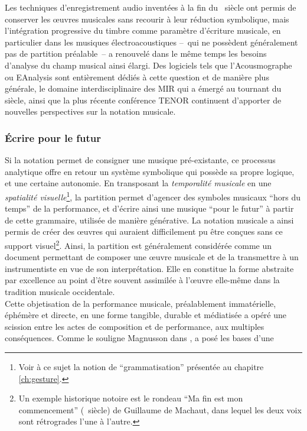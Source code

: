 \noindent Les techniques d'enregistrement audio inventées à la fin du ~siècle ont permis de conserver les œuvres musicales sans recourir à leur réduction symbolique, mais l'intégration progressive du timbre comme paramètre d'écriture musicale, en particulier dans les musiques électroacoustiques --~qui ne possèdent généralement pas de partition préalable~-- a renouvelé dans le même temps les besoins d'analyse du champ musical ainsi élargi. Des logiciels tels que l'Acousmographe \cite{favreau_lacousmographe_2010} ou EAnalysis \cite{couprie_eanalysis:_2016} sont entièrement dédiés à cette question et de manière plus générale, le domaine interdisciplinaire des \gls{MIR} qui a émergé au tournant du siècle, ainsi que la plus récente conférence \gls{TENOR} continuent d'apporter de nouvelles perspectives sur la notation musicale.

\subsubsection{Écrire pour le futur}

\noindent Si la notation permet de consigner une musique pré-existante, ce processus analytique offre en retour un système symbolique qui possède sa propre logique, et une certaine autonomie. En transposant la \textit{temporalité musicale} en une \textit{spatialité visuelle}\footnote{Voir à ce sujet la notion de ``grammatisation'' présentée au chapitre \ref{ch:gesture}.}, la partition permet d'agencer des symboles musicaux ``hors du temps'' de la performance, et d'écrire ainsi une musique ``pour le futur'' à partir de cette grammaire, utilisée de manière générative. La notation musicale a ainsi permis de créer des œuvres qui auraient difficilement pu être conçues sans ce support visuel\footnote{Un exemple historique notoire est le rondeau ``Ma fin est mon commencement'' (~siècle) de Guillaume de Machaut, dans lequel les deux voix sont rétrogrades l'une à l'autre.}. Ainsi, la partition est généralement considérée comme un document permettant de composer une œuvre musicale et de la transmettre à un instrumentiste en vue de son interprétation. Elle en constitue la forme abstraite par excellence au point d'être souvent assimilée à l'œuvre elle-même dans la tradition musicale occidentale.\\
\indent Cette objetisation de la performance musicale, préalablement immatérielle, éphémère et directe, en une forme tangible, durable et médiatisée a opéré une scission entre les actes de composition et de performance, aux multiples conséquences. Comme le souligne Magnusson dans \cite{magnusson_algorithms_2011},  a posé les bases d'une 

